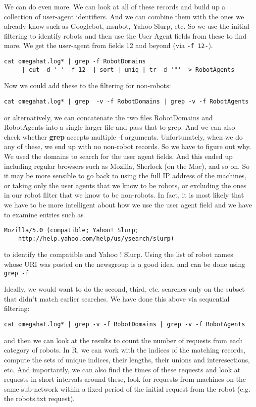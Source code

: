 \documentclass[10pt]{article}
\def\executable#1{\textbf{#1}}
\begin{document}
\begin{enumerate}
We can do even more. We can look at all of these records and build up a collection of user-agent
identifiers.  And we can combine them with the ones we already know such as Googlebot, msnbot, Yahoo
Slurp, etc.  So we use the initial filtering to identify robots and then use the User Agent fields
from these to find more.
We get the user-agent from fields 12 and beyond (via \verb+-f 12-+).
\begin{verbatim}
cat omegahat.log* | grep -f RobotDomains  
     | cut -d ' ' -f 12- | sort | uniq | tr -d '"'  > RobotAgents
\end{verbatim}
Now we could add these to the filtering for non-robots:
\begin{verbatim}
cat omegahat.log* | grep  -v -f RobotDomains | grep -v -f RobotAgents
\end{verbatim}
or alternatively, we can concatenate the two files
RobotDomains and RobotAgents into a single larger file
and pass that to grep.
And we can also check whether \executable{grep}
accepts multiple -f arguments.
Unfortunately, when we do any of these, we end up with no
non-robot records. So we have to figure out why.
We used the domains to search  for the user agent fields.
And this ended up including regular browsers such as  Mozilla, Sherlock (on the Mac), 
and so on. So it may be more sensible to go back to using the 
full IP address of the machines, or
taking only the user agents that we know to be robots, or excluding
the ones in our robot filter  that we know to be non-robots.
In fact, it is most likely that we have to be more intelligent
about how we use the user agent field and we have to
examine entries such as 
\begin{verbatim}
Mozilla/5.0 (compatible; Yahoo! Slurp; 
    http://help.yahoo.com/help/us/ysearch/slurp)
\end{verbatim}
to identify the compatible and Yahoo ! Slurp.
Using the list of robot names 
whose URI  was posted on the 
newsgroup is a good idea, and can be done
using \verb+grep -f+




Ideally, we would want to do the second, third, etc. searches only on the subset 
that didn't match earlier searches. We have done this above
via sequential filtering:
\begin{verbatim}
cat omegahat.log* | grep -v -f RobotDomains | grep -v -f RobotAgents
\end{verbatim}
and then we can look at the results to count the number of requests from each category of robots.
In R, we can work with the indices of the matching records, compute the sets of
unique indices, their lengths, their unions and interesections, etc.  And importantly, we can also
find the times of these requests and look at requests in short intervals around these, look for
requests from machines on the same sub-network within a fixed period of the initial request from the
robot (e.g. the robots.txt request).



\end{enumerate}
\end{document}
